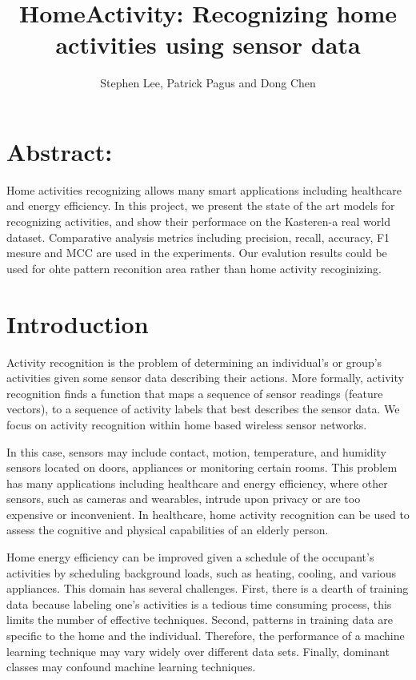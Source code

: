 \documentclass[11pt, oneside]{article}   	%
\title{HomeActivity: Recognizing home activities using sensor data}
\author{Stephen Lee, Patrick Pagus and Dong Chen}
\begin{document}
\maketitle
\section{Abstract:}
Home activities recognizing allows many smart applications including healthcare and energy efficiency. In this project, we present the state of the art models for recognizing activities, and show their performace on the Kasteren-a real world dataset. Comparative analysis metrics including precision, recall, accuracy, F1 mesure and MCC are used in the experiments. Our evalution results could be used for ohte pattern reconition area rather than home activity recoginizing.

\section{Introduction}

Activity recognition is the problem of determining an individual's or group's activities given some sensor data describing their actions. More formally, activity recognition finds a function that maps a sequence of sensor readings (feature vectors), to a sequence of activity labels that best describes the sensor data. We focus on activity recognition within home based wireless sensor networks. 

In this case, sensors may include contact, motion, temperature, and humidity sensors located on doors, appliances or monitoring certain rooms. This problem has many applications including healthcare and energy efficiency, where other sensors, such as cameras and wearables, intrude upon privacy or are too expensive or inconvenient. In healthcare, home activity recognition can be used to assess the cognitive and physical capabilities of an elderly person. 

Home energy efficiency can be improved given a schedule of the occupant's activities by scheduling background loads, such as heating, cooling, and various appliances. This domain has several challenges. First, there is a dearth of training data because labeling one's activities is a tedious time consuming process, this limits the number of effective techniques. Second, patterns in training data are specific to the home and the individual. Therefore, the performance of a machine learning technique may vary widely over different data sets. Finally, dominant classes may confound machine learning techniques.
\end{document}
